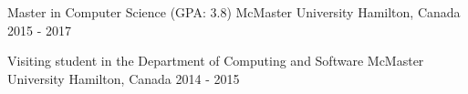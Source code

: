 \begin{cventries}
	\cvedu
    {Master in Computer Science (GPA: 3.8)}
    {McMaster University}
    {Hamilton, Canada}
    {2015 - 2017}
   
    \cvedu
    {Visiting student in the Department of Computing and Software}
    {McMaster University}
    {Hamilton, Canada}
    {2014 - 2015}
   
  

\end{cventries}